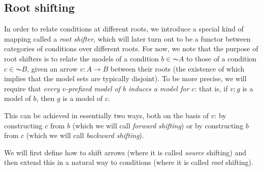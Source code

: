 \subsection{Root shifting}

In order to relate conditions at different roots, we introduce a special kind of mapping called a \emph{root shifter}, which will later turn out to be a functor between categories of conditions over different roots. For now, we note that the purpose of root shifters is to relate the models of a condition $b\in \AC A$ to those of a condition $c\in \AC B$, given an arrow $v:A\to B$ between their roots (the existence of which implies that the model sets are typically disjoint). To be more precise, we will require that \emph{every $v$-prefixed model of $b$ induces a model for $c$}: that is, if $v;g$ is a model of $b$, then $g$ is a model of $c$.

This can be achieved in essentially two ways, both on the basis of $v$: by constructing $c$ from $b$ (which we will call \emph{forward shifting}) or by constructing $b$ from $c$ (which we will call \emph{backward shifting}). 



We will first define how to shift arrows (where it is called \emph{source} shifting) and then extend this in a natural way to conditions (where it is called \emph{root} shifting).

